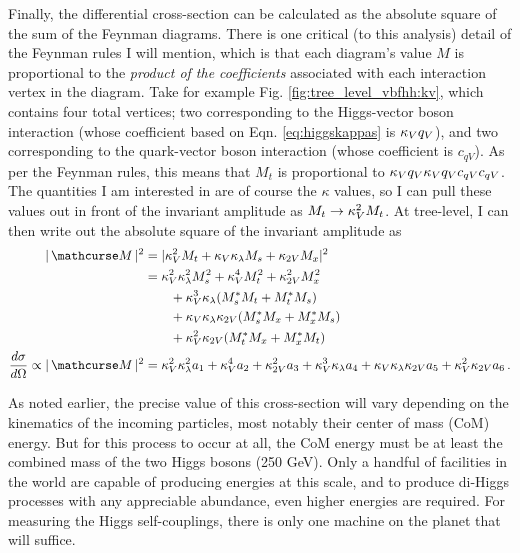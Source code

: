     Finally, the differential cross-section can be calculated as the absolute square of the sum of the Feynman diagrams.
    There is one critical (to this analysis) detail of the Feynman rules I will mention,
        which is that each diagram's value $M$ is proportional to the \textit{product of the coefficients}
        associated with each interaction vertex in the diagram.
    Take for example Fig. \ref{fig:tree_level_vbfhh:kv}, which contains four total vertices;
        two corresponding to the Higgs-vector boson interaction (whose coefficient based on Eqn. \ref{eq:higgskappas} is $\kappa_{V} q_V$),
        and two corresponding to the quark-vector boson interaction (whose coefficient is $c_{qV}$).
    As per the Feynman rules, this means that $M_t$ is proportional to $\kappa_{V} q_V \kappa_{V} q_V c_{qV} c_{qV}$.
    The quantities I am interested in are of course the $\kappa$ values,
        so I can pull these values out in front of the invariant amplitude as $M_t \rightarrow \kappa_{V}^2 M_t$.
    At tree-level, I can then write out the absolute square of the invariant amplitude as
    \begin{equation} \begin{split} \label{eq:tree_level_invamp}
        |\invAmp|^2 &= |  \kv^2 M_t + \kv \kl M_s + \kvv M_x |^2
        \\&= \kv^2 \kl^2 M_s^2 + \kv^4 M_t^2 + \kvv^2 M_x^2 
            \\&\qquad + \kv^3 \kl (M_s^* M_t + M_t^* M_s) 
            \\&\qquad + \kv \kl \kvv (M_s^* M_x + M_x^* M_s ) 
            \\&\qquad + \kv^2 \kvv (M_t^* M_x + M_x^* M_t )
        \\\dXsec \propto |\invAmp|^2 &= \kv^2 \kl^2 a_1 + \kv^4 a_2 + \kvv^2 a_3 + \kv^3 \kl a_4 + \kv \kl \kvv a_5 + \kv^2 \kvv a_6
        \,.
    \end{split} \end{equation}

    As noted earlier, the precise value of this cross-section will vary depending on the kinematics of the incoming particles,
        most notably their center of mass (CoM) energy.
    But for this process to occur at all, the CoM energy must be at least the combined mass of the two Higgs bosons (250 GeV).
    Only a handful of facilities in the world are capable of producing energies at this scale,
        and to produce di-Higgs processes with any appreciable abundance,
        even higher energies are required.
    For measuring the Higgs self-couplings, there is only one machine on the planet that will suffice.
